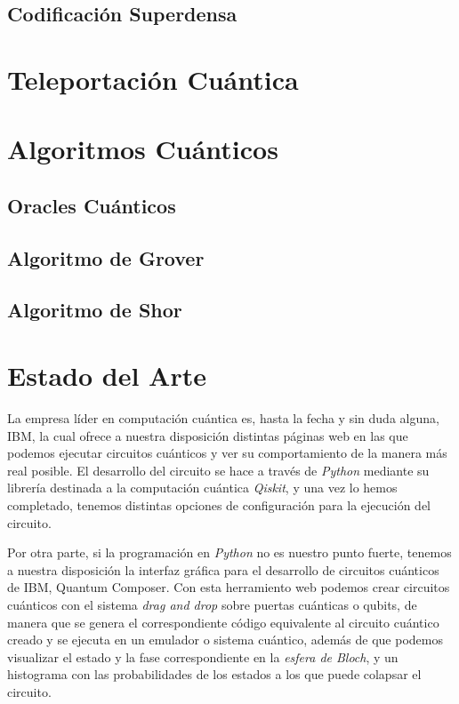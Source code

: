 \documentclass{article}
\numberwithin{equation}{section} %
\begin{document}
    \subsection{Codificación Superdensa}
    \section{Teleportación Cuántica}
    \section{Algoritmos Cuánticos}
    \subsection{Oracles Cuánticos}
    \subsection{Algoritmo de Grover}
    \subsection{Algoritmo de Shor}

    \section{Estado del Arte}

    \vspace{5mm}

    La empresa líder en computación cuántica es, hasta la fecha y sin duda alguna, IBM, la cual ofrece a nuestra disposición distintas páginas web en las que podemos ejecutar circuitos cuánticos y ver su comportamiento de la manera más real posible. El desarrollo del circuito se hace a través de \textit{Python} mediante su librería destinada a la computación cuántica \textit{Qiskit}, y una vez lo hemos completado, tenemos distintas opciones de configuración para la ejecución del circuito.

    \vspace{5mm}

    Por otra parte, si la programación en \textit{Python} no es nuestro punto fuerte, tenemos a nuestra disposición la interfaz gráfica para el desarrollo de circuitos cuánticos de IBM, Quantum Composer. Con esta herramiento web podemos crear circuitos cuánticos con el sistema \textit{drag and drop} sobre puertas cuánticas o qubits, de manera que se genera el correspondiente código equivalente al circuito cuántico creado y se ejecuta en un emulador o sistema cuántico, además de que podemos visualizar el estado y la fase correspondiente en la \textit{esfera de Bloch}, y un histograma con las probabilidades de los estados a los que puede colapsar el circuito.
    
\end{document}

